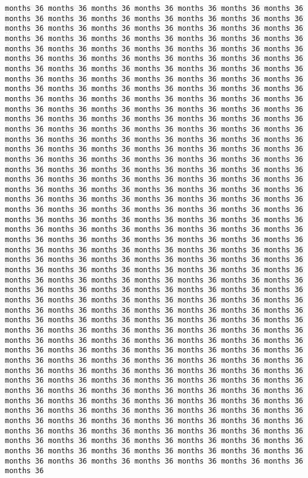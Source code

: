 \documentclass[11pt]{article}
\begin{document}
\begin{Verbatim}[commandchars=\\\{\}, frame=single, framerule=2mm, rulecolor=\color{outerrorbackground}]
months 36 months 36 months 36 months 36 months 36 months 36 months 36 months 36 months 36 months 36 months 36 months 36 months 36 months 36 months 36 months 36 months 36 months 36 months 36 months 36 months 36 months 36 months 36 months 36 months 36 months 36 months 36 months 36 months 36 months 36 months 36 months 36 months 36 months 36 months 36 months 36 months 36 months 36 months 36 months 36 months 36 months 36 months 36 months 36 months 36 months 36 months 36 months 36 months 36 months 36 months 36 months 36 months 36 months 36 months 36 months 36 months 36 months 36 months 36 months 36 months 36 months 36 months 36 months 36 months 36 months 36 months 36 months 36 months 36 months 36 months 36 months 36 months 36 months 36 months 36 months 36 months 36 months 36 months 36 months 36 months 36 months 36 months 36 months 36 months 36 months 36 months 36 months 36 months 36 months 36 months 36 months 36 months 36 months 36 months 36 months 36 months 36 months 36 months 36 months 36 months 36 months 36 months 36 months 36 months 36 months 36 months 36 months 36 months 36 months 36 months 36 months 36 months 36 months 36 months 36 months 36 months 36 months 36 months 36 months 36 months 36 months 36 months 36 months 36 months 36 months 36 months 36 months 36 months 36 months 36 months 36 months 36 months 36 months 36 months 36 months 36 months 36 months 36 months 36 months 36 months 36 months 36 months 36 months 36 months 36 months 36 months 36 months 36 months 36 months 36 months 36 months 36 months 36 months 36 months 36 months 36 months 36 months 36 months 36 months 36 months 36 months 36 months 36 months 36 months 36 months 36 months 36 months 36 months 36 months 36 months 36 months 36 months 36 months 36 months 36 months 36 months 36 months 36 months 36 months 36 months 36 months 36 months 36 months 36 months 36 months 36 months 36 months 36 months 36 months 36 months 36 months 36 months 36 months 36 months 36 months 36 months 36 months 36 months 36 months 36 months 36 months 36 months 36 months 36 months 36 months 36 months 36 months 36 months 36 months 36 months 36 months 36 months 36 months 36 months 36 months 36 months 36 months 36 months 36 months 36 months 36 months 36 months 36 months 36 months 36 months 36 months 36 months 36 months 36 months 36 months 36 months 36 months 36 months 36 months 36 months 36 months 36 months 36 months 36 months 36 months 36 months 36 months 36 months 36 months 36 months 36 months 36 months 36 months 36 months 36 months 36 months 36 months 36 months 36 months 36 months 36 months 36 months 36 months 36 months 36 months 36 months 36 months 36 months 36 months 36 months 36 months 36 months 36 months 36 months 36 months 36 months 36 months 36 months 36 months 36 months 36 months 36 months 36 months 36 months 36 months 36 months 36 months 36 months 36 months 36 months 36 months 36 months 36 months 36 months 36 months 36 months 36 months 36 months 36 months 36 months 36 months 36 months 36 months 36 months 36 months 36 months 36 months 36 months 36 months 36 months 36 months 36 months 36 months 36 months 36 months 36 months 36 months 36 months 36 months 36 months 36 months 36 months 36 months 36 months 36 months 36 months 36 months 36 
\end{Verbatim}
\end{document}
